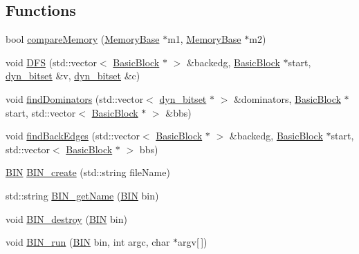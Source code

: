 \subsection*{\-Functions}
\begin{DoxyCompactItemize}
\item 
bool \hyperlink{namespace_e_p_a_x_aef55d3382820337f1f2759dca145b428}{compare\-Memory} (\hyperlink{class_e_p_a_x_1_1_memory_base}{\-Memory\-Base} $\ast$m1, \hyperlink{class_e_p_a_x_1_1_memory_base}{\-Memory\-Base} $\ast$m2)
\item 
void \hyperlink{namespace_e_p_a_x_a5752705510b295071dfd27e79b938e0d}{\-D\-F\-S} (std\-::vector$<$ \hyperlink{class_e_p_a_x_1_1_basic_block}{\-Basic\-Block} $\ast$ $>$ \&backedg, \hyperlink{class_e_p_a_x_1_1_basic_block}{\-Basic\-Block} $\ast$start, \hyperlink{class_e_p_a_x_1_1dyn__bitset}{dyn\-\_\-bitset} \&v, \hyperlink{class_e_p_a_x_1_1dyn__bitset}{dyn\-\_\-bitset} \&c)
\item 
void \hyperlink{namespace_e_p_a_x_ab8ccb9381b8e727c3e5621289773dff0}{find\-Dominators} (std\-::vector$<$ \hyperlink{class_e_p_a_x_1_1dyn__bitset}{dyn\-\_\-bitset} $\ast$ $>$ \&dominators, \hyperlink{class_e_p_a_x_1_1_basic_block}{\-Basic\-Block} $\ast$start, std\-::vector$<$ \hyperlink{class_e_p_a_x_1_1_basic_block}{\-Basic\-Block} $\ast$ $>$ \&bbs)
\item 
void \hyperlink{namespace_e_p_a_x_abeda76fae888011a629ecfeee0f3bdbe}{find\-Back\-Edges} (std\-::vector$<$ \hyperlink{class_e_p_a_x_1_1_basic_block}{\-Basic\-Block} $\ast$ $>$ \&backedg, \hyperlink{class_e_p_a_x_1_1_basic_block}{\-Basic\-Block} $\ast$start, std\-::vector$<$ \hyperlink{class_e_p_a_x_1_1_basic_block}{\-Basic\-Block} $\ast$ $>$ bbs)
\item 
\hyperlink{namespace_e_p_a_x_ad71db9d891528e4a8b303787dff8ac0b}{\-B\-I\-N} \hyperlink{namespace_e_p_a_x_a68500dbda3daf6e66dc6bf0067ec34b7}{\-B\-I\-N\-\_\-create} (std\-::string file\-Name)
\item 
std\-::string \hyperlink{namespace_e_p_a_x_af6914ca60796cbbf43e9996bed07763d}{\-B\-I\-N\-\_\-get\-Name} (\hyperlink{namespace_e_p_a_x_ad71db9d891528e4a8b303787dff8ac0b}{\-B\-I\-N} bin)
\item 
void \hyperlink{namespace_e_p_a_x_a8df16d3fb7f820014a3d6105514420a5}{\-B\-I\-N\-\_\-destroy} (\hyperlink{namespace_e_p_a_x_ad71db9d891528e4a8b303787dff8ac0b}{\-B\-I\-N} bin)
\item 
void \hyperlink{namespace_e_p_a_x_afbd9f1c546839fb945653279303f2b71}{\-B\-I\-N\-\_\-run} (\hyperlink{namespace_e_p_a_x_ad71db9d891528e4a8b303787dff8ac0b}{\-B\-I\-N} bin, int argc, char $\ast$argv\mbox{[}$\,$\mbox{]})

\end{DoxyCompactItemize}
